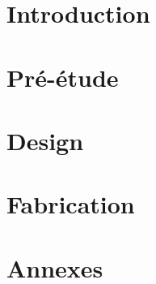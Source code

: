 \documentclass[12pt, twoside]{report}
\begin{document}
	
	
	\maketitle
	\cleardoublepage
	
	
	\tableofcontents
	
	
	
	\cleardoublepage
	\part{Introduction}
	\cleardoublepage
	
	
	
	
	\cleardoublepage
	\part{Pré-étude}
	\cleardoublepage
	
	
	
	
	\cleardoublepage
	\part{Design}
	\cleardoublepage
	
	
	
	
	\cleardoublepage
	\part{Fabrication}
	\cleardoublepage
	
	
	
	
	\cleardoublepage
	\part{Annexes}
	\cleardoublepage
	
	
	
	
\end{document}
